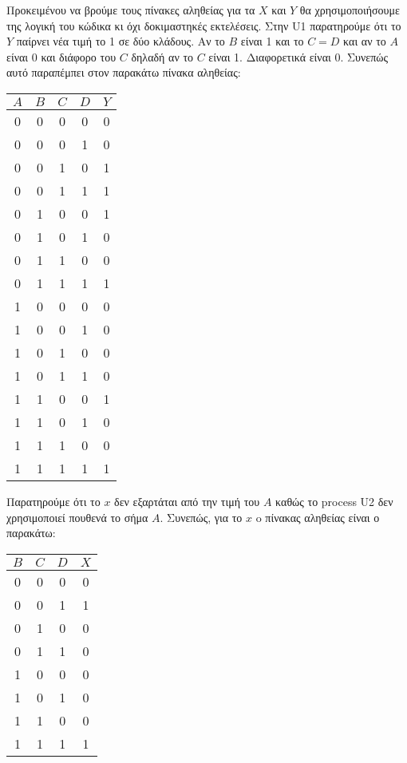 \documentclass[11pt, a4paper]{report}
\begin{document}
\inputminted{vhdl}{./code/part-1/prompt.vhdl}

Προκειμένου να βρούμε τους πίνακες αληθείας για τα $X$ και $Y$ θα χρησιμοποιήσουμε της λογική του κώδικα κι όχι δοκιμαστηκές εκτελέσεις.
Στην U1 παρατηρούμε ότι το $Y$ παίρνει νέα τιμή το 1 σε δύο κλάδους.
Αν το $B$ είναι 1 και το $C = D$ και αν το $Α$ είναι 0 και διάφορο του $C$ δηλαδή αν το $C$ είναι 1.
Διαφορετικά είναι 0. Συνεπώς αυτό παραπέμπει στον παρακάτω πίνακα αληθείας:
\begin{center}
	\begin{tabular} {|c|c|c|c|c|}
		\hline
		$A$ & $B$ & $C$ & $D$ & $Y$ \\
		\hline
		0   & 0   & 0   & 0   & 0   \\
		0   & 0   & 0   & 1   & 0   \\
		0   & 0   & 1   & 0   & 1   \\
		0   & 0   & 1   & 1   & 1   \\
		0   & 1   & 0   & 0   & 1   \\
		0   & 1   & 0   & 1   & 0   \\
		0   & 1   & 1   & 0   & 0   \\
		0   & 1   & 1   & 1   & 1   \\
		1   & 0   & 0   & 0   & 0   \\
		1   & 0   & 0   & 1   & 0   \\
		1   & 0   & 1   & 0   & 0   \\
		1   & 0   & 1   & 1   & 0   \\
		1   & 1   & 0   & 0   & 1   \\
		1   & 1   & 0   & 1   & 0   \\
		1   & 1   & 1   & 0   & 0   \\
		1   & 1   & 1   & 1   & 1   \\
		\hline
	\end{tabular}
\end{center}

Παρατηρούμε ότι το $x$ δεν εξαρτάται από την τιμή του $A$ καθώς το process U2 δεν χρησιμοποιεί πουθενά το σήμα $A$.
Συνεπώς, για το $x$ o πίνακας αληθείας είναι ο παρακάτω:
\begin{center}
	\begin{tabular} {|c|c|c|c|}
		\hline
		$B$ & $C$ & $D$ & $X$ \\
		\hline
		0   & 0   & 0   & 0   \\
		0   & 0   & 1   & 1   \\
		0   & 1   & 0   & 0   \\
		0   & 1   & 1   & 0   \\
		1   & 0   & 0   & 0   \\
		1   & 0   & 1   & 0   \\
		1   & 1   & 0   & 0   \\
		1   & 1   & 1   & 1   \\
		\hline
	\end{tabular}
\end{center}
\end{document}
